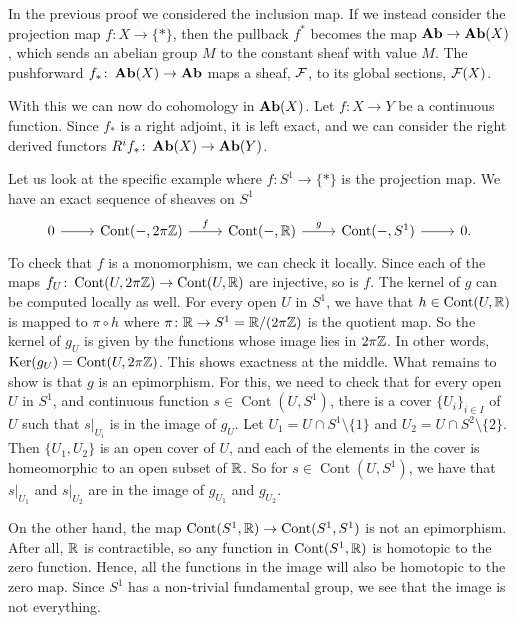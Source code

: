 \documentclass{article}
\DeclareMathOperator{\Cont}{Cont}
\begin{document}
In the previous proof we considered the inclusion map.
If we instead consider the projection map $f\colon X \to \{*\}$,
then the pullback $f^*$ becomes the map $\operatorname{\mathbf{Ab}} \to \operatorname{\mathbf{Ab}}(X)$,
which sends an abelian group $M$ to the constant sheaf with
value $M$. The pushforward $f_*\colon \operatorname{\mathbf{Ab}}(X) \to \operatorname{\mathbf{Ab}}$ maps
a sheaf, $\mathcal{F}$, to its global sections, $\mathcal{F}(X)$.

With this we can now do cohomology in $\operatorname{\mathbf{Ab}}(X)$.
Let $f\colon X \to Y$ be a continuous function.
Since $f_*$ is a right adjoint, it is left exact, and
we can consider the right derived functors $R^if_* \colon \operatorname{\mathbf{Ab}}(X) \to \operatorname{\mathbf{Ab}}(Y)$.

\begin{example}
    Let us look at the specific example where $f \colon S^1 \to \{*\}$
    is the projection map. We have an exact sequence of sheaves on $S^1$
    \begin{equation*}
        \begin{tikzcd}
            0 \rar & \Cont(-, 2\pi \bbZ) \rar["f"] & \Cont(-, \bbR)
            \rar["g"] & \Cont(-, S^1) \rar & 0.
        \end{tikzcd}
    \end{equation*}
    To check that $f$ is a monomorphism, we can check it locally. Since
    each of the maps $f_U \colon \Cont(U, 2\pi \bbZ) \to \Cont(U, \bbR)$ are injective,
    so is $f$. The kernel of $g$ can be computed locally as well.
    For every open $U$ in $S^1$, we have that $h \in \Cont(U, \bbR)$ is
    mapped to $\pi \circ h$ where $\pi \colon \mathbb{R} \to S^1 = \mathbb{R} / (2\pi \mathbb{Z})$
    is the quotient map. So the kernel of $g_U$ is given by the functions
    whose image lies in $2\pi \mathbb{Z}$. In other words, $\Ker(g_U) = \Cont(U, 2\pi \bbZ)$.
    This shows exactness at the middle. What remains to show is that $g$ is an
    epimorphism. For this, we need to check that for every open $U$ in $S^1$,
    and continuous function $s \in \Cont(U, S^1)$, there is a cover $\{U_i\}_{i\in I}$
    of $U$ such that $s|_{U_i}$ is in the image of $g_U$. Let $U_1 = U \cap S^1 \setminus \{1\} $
    and $U_2 = U \cap S^2 \setminus \{2\}$. Then $\{U_1,U_2\}$ is an open cover
    of $U$, and each of the elements in the cover is homeomorphic to an open subset of $\mathbb{R}$.
    So for $s\in \Cont(U, S^1)$, we have that $s|_{U_1}$ and $s|_{U_2}$
    are in the image of $g_{U_1}$ and $g_{U_2}$.

    On the other hand, the map $\Cont(S^1 , \bbR) \to \Cont(S^1, S^1)$ is
    not an epimorphism. After all, $\mathbb{R}$ is contractible, so any
    function in $\Cont(S^1, \bbR)$ is homotopic to the zero function. Hence,
    all the functions in the image will also be homotopic to the zero map.
    Since $S^1$ has a non-trivial fundamental group, we see that the image
    is not everything.


\end{example}
\end{document}
